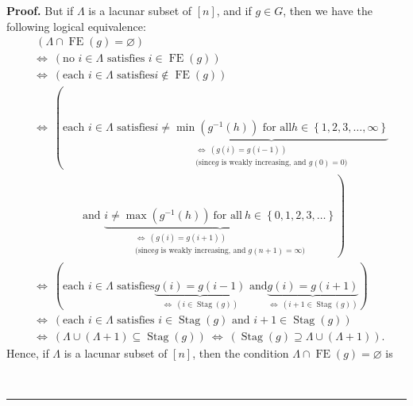 \documentclass[numbers=enddot,12pt,final,onecolumn,notitlepage]{scrartcl}%
\theoremstyle{definition}
\newenvironment{proof}[1][Proof]{\noindent\textbf{#1.} }{\ \rule{0.5em}{0.5em}}
\newenvironment{verlong}{}{}
\begin{document}
\begin{verlong}
\begin{proof}
But if $\Lambda$ is a lacunar subset of $\left[  n\right]  $, and if $g\in G$,
then we have the following logical equivalence:%
\begin{align*}
&  \ \left(  \Lambda\cap\operatorname*{FE}\left(  g\right)  =\varnothing
\right) \\
&  \Longleftrightarrow\ \left(  \text{no }i\in\Lambda\text{ satisfies }%
i\in\operatorname*{FE}\left(  g\right)  \right) \\
&  \Longleftrightarrow\ \left(  \text{each }i\in\Lambda\text{ satisfies
}i\notin\operatorname*{FE}\left(  g\right)  \right) \\
&  \Longleftrightarrow\ \left(  \text{each }i\in\Lambda\text{ satisfies
}\underbrace{i\neq\min\left(  g^{-1}\left(  h\right)  \right)  \text{ for all
}h\in\left\{  1,2,3,\ldots,\infty\right\}  }_{\substack{\Longleftrightarrow
\ \left(  g\left(  i\right)  =g\left(  i-1\right)  \right)  \\\text{(since
}g\text{ is weakly increasing, and }g\left(  0\right)  =0\text{)}}}\right. \\
&  \ \ \ \ \ \ \ \ \ \ \ \ \ \ \ \ \ \ \ \ \left.  \text{and }%
\underbrace{i\neq\max\left(  g^{-1}\left(  h\right)  \right)  \ \text{for
all}\ h\in\left\{  0,1,2,3,\ldots\right\}  }_{\substack{\Longleftrightarrow
\ \left(  g\left(  i\right)  =g\left(  i+1\right)  \right)  \\\text{(since
}g\text{ is weakly increasing, and }g\left(  n+1\right)  =\infty\text{)}%
}}\right) \\
&  \Longleftrightarrow\ \left(  \text{each }i\in\Lambda\text{ satisfies
}\underbrace{g\left(  i\right)  =g\left(  i-1\right)  }_{\Longleftrightarrow
\ \left(  i\in\operatorname*{Stag}\left(  g\right)  \right)  }\text{ and
}\underbrace{g\left(  i\right)  =g\left(  i+1\right)  }_{\Longleftrightarrow
\ \left(  i+1\in\operatorname*{Stag}\left(  g\right)  \right)  }\right) \\
&  \Longleftrightarrow\ \left(  \text{each }i\in\Lambda\text{ satisfies }%
i\in\operatorname*{Stag}\left(  g\right)  \text{ and }i+1\in
\operatorname*{Stag}\left(  g\right)  \right) \\
&  \Longleftrightarrow\ \left(  \Lambda\cup\left(  \Lambda+1\right)
\subseteq\operatorname*{Stag}\left(  g\right)  \right)  \ \Longleftrightarrow
\ \left(  \operatorname*{Stag}\left(  g\right)  \supseteq\Lambda\cup\left(
\Lambda+1\right)  \right)  .
\end{align*}
Hence, if $\Lambda$ is a lacunar subset of $\left[  n\right]  $, then the
condition $\Lambda\cap\operatorname*{FE}\left(  g\right)  =\varnothing$ is

\end{proof}
\end{verlong}
\end{document}
